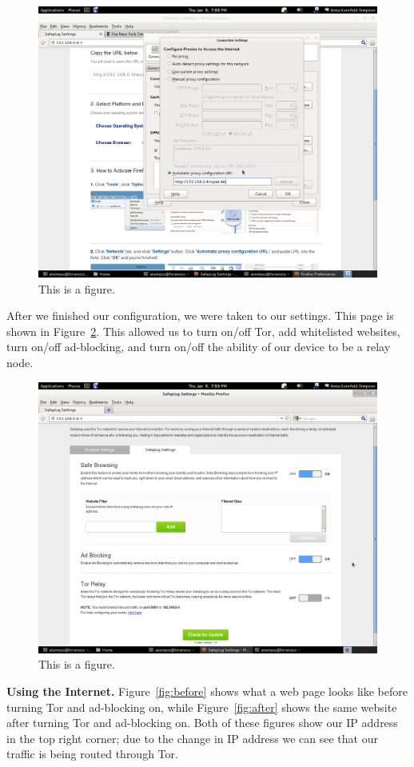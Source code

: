 \begin{figure}[t]
\begin{center}
\includegraphics[width=.75\textwidth]{proxyconfig}
\caption{This is a figure.}
\label{fig:proxyconfig}
\end{center}
\end{figure}

After we finished our configuration, we were taken to our settings.  This page is shown in Figure~\ref{fig:settings}.  This allowed us to turn on/off Tor, add whitelisted websites, turn on/off ad-blocking, and turn on/off the ability of our device to be a relay node.  

\begin{figure}[htb]
\begin{center}
\includegraphics[width=.75\textwidth]{settings}
\caption{This is a figure.}
\label{fig:settings}
\end{center}
\end{figure}

{\bf Using the Internet.} Figure~\ref{fig:before} shows what a web page looks like before turning Tor and ad-blocking on, while Figure~\ref{fig:after} shows the same website after turning Tor and ad-blocking on.  Both of these figures show our IP address in the top right corner; due to the change in IP address we can see that our traffic is being routed through Tor.  

